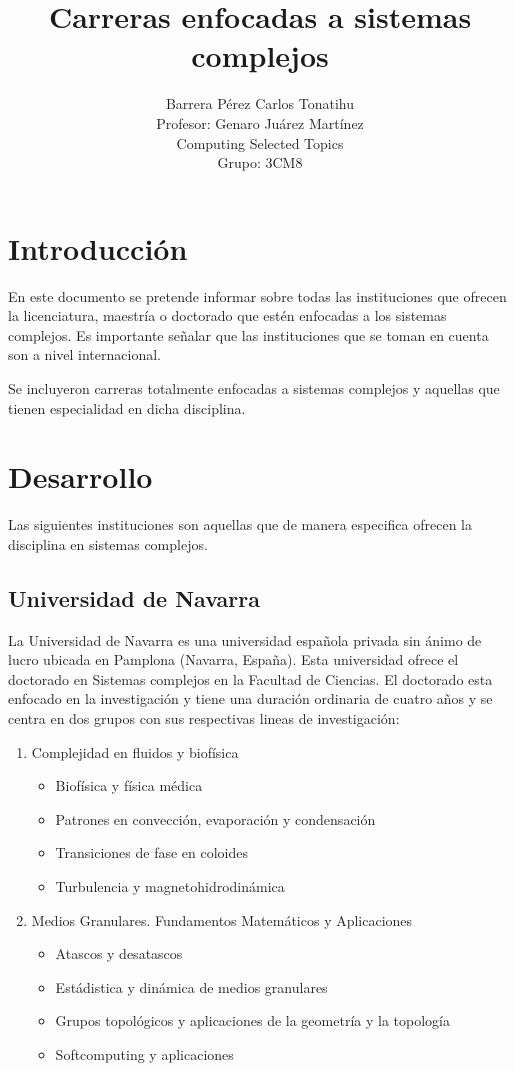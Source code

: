 \documentclass[a4paper,12pt]{article}
\title{Carreras enfocadas a sistemas complejos}
\author{Barrera Pérez Carlos Tonatihu \\ Profesor: Genaro Juárez Martínez \\ Computing Selected Topics \\ Grupo: 3CM8 }
\begin{document}
\maketitle
\newpage
\tableofcontents
\newpage
\section{Introducción}
En este documento se pretende informar sobre todas las instituciones que ofrecen la licenciatura, maestría o doctorado que estén enfocadas a los sistemas complejos. Es importante señalar que las instituciones que se toman en cuenta son a nivel internacional.

Se incluyeron carreras totalmente enfocadas a sistemas complejos y aquellas que tienen especialidad en dicha disciplina.

\section{Desarrollo}
Las siguientes instituciones son aquellas que de manera especifica ofrecen la disciplina en sistemas complejos.
\subsection{Universidad de Navarra}
La Universidad de Navarra es una universidad española privada sin ánimo de lucro ubicada en Pamplona (Navarra, España). Esta universidad ofrece el doctorado en Sistemas complejos en la Facultad de Ciencias. El doctorado esta enfocado en la investigación y tiene una duración ordinaria de cuatro años y se centra en dos grupos con sus respectivas lineas de investigación:
\begin{enumerate}

 \item Complejidad en fluidos y biofísica
 \begin{itemize}
  \item Biofísica y física médica
  \item Patrones en convección, evaporación y condensación
  \item Transiciones de fase en coloides
  \item Turbulencia y magnetohidrodinámica
 \end{itemize}

 \item Medios Granulares. Fundamentos Matemáticos y Aplicaciones
 \begin{itemize}
  \item Atascos y desatascos
  \item Estádistica y dinámica de medios granulares
  \item Grupos topológicos y aplicaciones de la geometría y la topología
  \item Softcomputing y aplicaciones
 \end{itemize}

\end{enumerate}
\end{document}
